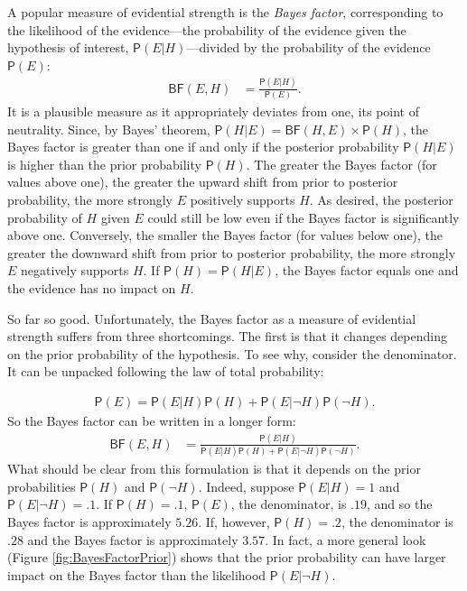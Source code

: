 \documentclass[
  10pt,
  dvipsnames,enabledeprecatedfontcommands]{scrartcl}
\newcommand{\n}{\neg}
\newcommand{\pr}[1]{\mathsf{P}(#1)}
\begin{document}
A popular measure of evidential strength is the \emph{Bayes factor},
corresponding to the likelihood of the evidence---the probability of the
evidence given the hypothesis of interest, \(\pr{E \vert H}\)---divided
by the probability of the evidence \(\pr{E}\): \begin{align*} 
\mathsf{BF}(E,H) & = \frac{\pr{E \vert H}}{\pr{E}}.
\end{align*} \noindent It is a plausible measure as it appropriately
deviates from one, its point of neutrality. Since, by Bayes' theorem,
\(\pr{H \vert E} = \mathsf{BF}(H, E) \times \pr{H}\), the Bayes factor
is greater than one if and only if the posterior probability
\(\pr{H \vert E}\) is higher than the prior probability \(\pr{H}\). The
greater the Bayes factor (for values above one), the greater the upward
shift from prior to posterior probability, the more strongly \(E\)
positively supports \(H\). As desired, the posterior probability of
\(H\) given \(E\) could still be low even if the Bayes factor is
significantly above one. Conversely, the smaller the Bayes factor (for
values below one), the greater the downward shift from prior to
posterior probability, the more strongly \(E\) negatively supports
\(H\). If \(\pr{H}=\pr{H\vert E}\), the Bayes factor equals one and the
evidence has no impact on \(H\).

So far so good. Unfortunately, the Bayes factor as a measure of
evidential strength suffers from three shortcomings. The first is that
it changes depending on the prior probability of the hypothesis. To see
why, consider the denominator. It can be unpacked following the law of
total probability:

\vspace{-3mm}

\begin{align} \label{eq:lotpSimple}
\pr{E}= \pr{E \vert H} \pr{H}+\pr{E \vert \neg H} \pr{\neg H}.
\end{align} \noindent  So the Bayes factor can be written in a longer
form: \begin{align}\label{eq:BFlotp}
\mathsf{BF}(E,H) & = \frac{\pr{E \vert H}}{\pr{E \vert H} \pr{H}+\pr{E \vert \neg H} \pr{\neg H}}.
\end{align} \noindent What should be clear from this formulation is that
it depends on the prior probabilities \(\pr{H}\) and \(\pr{\neg H}\).
Indeed, suppose \(\pr{E \vert H} = 1\) and \(\pr{E \vert \neg H} = .1\).
If \(\pr{H}=.1\), \(\pr{E}\), the denominator, is \(.19\), and so the
Bayes factor is approximately \(5.26\). If, however, \(\pr{H} =.2\), the
denominator is \(.28\) and the Bayes factor is approximately \(3.57\).
In fact, a more general look (Figure \ref{fig:BayesFactorPrior}) shows
that the prior probability can have larger impact on the Bayes factor
than the likelihood \(\pr{E \vert \n H}\).
\end{document}
